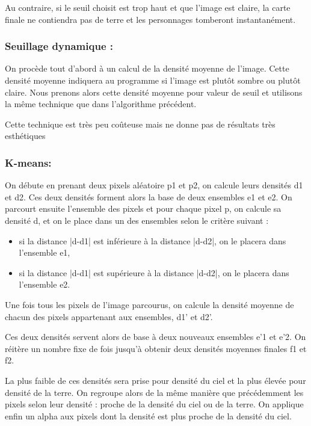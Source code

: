 \documentclass{report}
\begin{document}
Au contraire, si le seuil choisit est trop
haut et que l’image est claire, la carte finale ne contiendra pas de
terre et les personnages tomberont instantanément.

\subsubsection{Seuillage dynamique :}

On procède tout d’abord à un calcul de la densité moyenne de l’image.
Cette densité moyenne indiquera au programme si l’image est plutôt
sombre ou plutôt claire. Nous prenons alors cette densité moyenne pour
valeur de seuil et utilisons la même technique que dans l’algorithme
précédent.
\bigskip

Cette technique est très peu coûteuse mais ne donne pas de résultats
très esthétiques

\subsubsection{K-means:}

On débute en prenant deux pixels aléatoire p1 et p2, on calcule leurs
densités d1 et d2. Ces deux densités forment alors la base de deux
ensembles e1 et e2. On parcourt ensuite l’ensemble des pixels et pour
chaque pixel p, on calcule sa densité d, et on le place dans un des
ensembles selon le critère suivant :
\bigskip

\begin{itemize}
\item si la distance |d-d1| est inférieure à la distance |d-d2|, on le
placera dans l’ensemble e1,
\item si la distance |d-d1| est supérieure à la distance |d-d2|, on le
placera dans l’ensemble e2.
\end{itemize}
\bigskip

Une fois tous les pixels de l’image parcourus, on calcule la densité
moyenne de chacun des pixels appartenant aux ensembles, d1’ et d2’.

Ces deux densités servent alors de base à deux nouveaux ensembles e’1 et e’2.
On réitère un nombre fixe de fois jusqu’à obtenir deux densités moyennes
finales f1 et f2.

La plus faible de ces densités sera prise pour densité
du ciel et la plus élevée pour densité de la terre. On regroupe alors de
la même manière que précédemment les pixels selon leur densité : proche
de la densité du ciel ou de la terre. On applique enfin un alpha aux
pixels dont la densité est plus proche de la densité du ciel.
\bigskip
\end{document}
